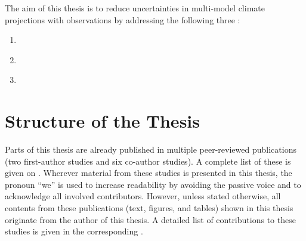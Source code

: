 The aim of this thesis is to reduce uncertainties in multi-model climate
projections with observations by addressing the following three
:

\begingroup
{}
\begin{enumerate}
  \item \label{enum:01:question_1} \KeyScienceQuestionOne{}
  \item \label{enum:01:question_2} \KeyScienceQuestionTwo{}
  \item \label{enum:01:question_3} \KeyScienceQuestionThree{}
\end{enumerate}
\endgroup


\section{Structure of the Thesis}
\label{sec:01:structure}

Parts of this thesis are already published in multiple peer-reviewed
publications (two first-author studies and six co-author studies). A complete
list of these is given on . Wherever material from these
studies is presented in this thesis, the pronoun \enquote{we} is used to
increase readability by avoiding the passive voice and to acknowledge all
involved contributors. However, unless stated otherwise, all contents from
these publications (text, figures, and tables) shown in this thesis originate
from the author of this thesis. A detailed list of contributions to these
studies is given in the corresponding .

